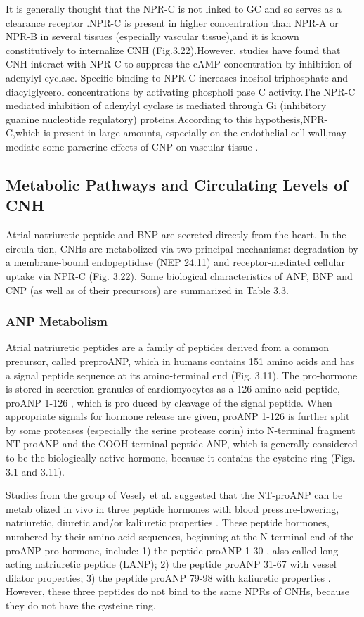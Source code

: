 \documentclass[14pt,a4paper,onecolumn]{extarticle}
\begin{document}
It is generally thought that the NPR-C is not linked to GC and so serves as a clearance receptor \citep{28} \citep{77} \citep{78}.NPR-C is present in higher concentration than NPR-A or NPR-B in several tissues (especially vascular tissue),and it is known constitutively to internalize CNH \citep{172} (Fig.3.22).However, studies have found that CNH interact with NPR-C to suppress the cAMP concentration by inhibition of adenylyl cyclase. Specific binding to NPR-C increases inositol triphosphate and diacylglycerol concentrations by activating phospholi pase C activity.The NPR-C mediated inhibition of adenylyl cyclase is mediated through Gi (inhibitory guanine nucleotide regulatory) proteins.According to this hypothesis,NPR-C,which is present in large amounts, especially on the endothelial cell wall,may mediate some paracrine effects of CNP on vascular tissue \citep{168} \citep{190}.

\subsection{Metabolic Pathways and Circulating Levels of CNH}
Atrial natriuretic peptide and BNP are secreted directly from the heart. In the circula tion, CNHs are metabolized via two principal mechanisms: degradation by a membrane-bound endopeptidase (NEP 24.11) and receptor-mediated cellular uptake via NPR-C \citep{14} (Fig. 3.22). Some biological characteristics of ANP, BNP and CNP (as well as of their precursors) are summarized in Table 3.3.

\subsubsection{ANP Metabolism}
Atrial natriuretic peptides are a family of peptides derived from a common precursor, called preproANP, which in humans contains 151 amino acids and has a signal peptide sequence at its amino-terminal end (Fig. 3.11). The pro-hormone is stored in secretion granules of cardiomyocytes as a 126-amino-acid peptide, proANP 1-126 , which is pro duced by cleavage of the signal peptide. When appropriate signals for hormone release are given, proANP 1-126 is further split by some proteases (especially the serine protease corin) \citep{192} into N-terminal fragment NT-proANP and the COOH-terminal peptide ANP, which is generally considered to be the biologically active hormone, because it contains the cysteine ring (Figs. 3.1 and 3.11).

Studies from the group of Vesely et al. suggested that the NT-proANP can be metab olized in vivo in three peptide hormones with blood pressure-lowering, natriuretic, diuretic and/or kaliuretic properties \citep{100}. These peptide hormones, numbered by their amino acid sequences, beginning at the N-terminal end of the proANP pro-hormone, include: 1) the peptide proANP 1-30 , also called long-acting natriuretic peptide (LANP); 2) the peptide proANP 31-67 with vessel dilator properties; 3) the peptide proANP 79-98 with kaliuretic properties \citep{98}. However, these three peptides do not bind to the same NPRs of CNHs, because they do not have the cysteine ring.
\end{document}
